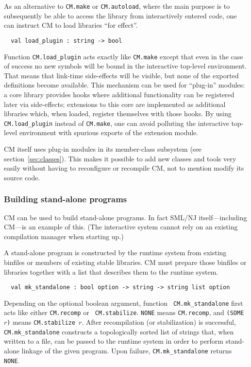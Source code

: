 \documentclass{article}
\begin{document}
As an alternative to {\tt CM.make} or {\tt CM.autoload}, where the
main purpose is to subsequently be able to access the library from
interactively entered code, one can instruct CM to load libraries
``for effect''.

\begin{verbatim}
  val load_plugin : string -> bool
\end{verbatim}

Function {\tt CM.load\_plugin} acts exactly like {\tt CM.make} except
that even in the case of success no new symbols will be bound in the
interactive top-level environment.  That means that link-time
side-effects will be visible, but none of the exported definitions
become available.  This mechanism can be used for ``plug-in'' modules:
a core library provides hooks where additional functionality can be
registered later via side-effects; extensions to this core are
implemented as additional libraries which, when loaded, register
themselves with those hooks.  By using {\tt CM.load\_plugin} instead
of {\tt CM.make}, one can avoid polluting the interactive top-level
environment with spurious exports of the extension module.

CM itself uses plug-in modules in its member-class subsystem (see
section~\ref{sec:classes}).  This makes it possible to add new classes
and tools very easily without having to reconfigure or recompile CM,
not to mention modify its source code.

\subsubsection*{Building stand-alone programs}

CM can be used to build stand-alone programs. In fact SML/NJ
itself---including CM---is an example of this.  (The interactive
system cannot rely on an existing compilation manager when starting
up.)

A stand-alone program is constructed by the runtime system from
existing binfiles or members of existing stable libraries.  CM must
prepare those binfiles or libraries together with a list that
describes them to the runtime system.

\begin{verbatim}
  val mk_standalone : bool option -> string -> string list option
\end{verbatim}

Depending on the optional boolean argument, function {\tt
CM.mk\_standalone} first acts like either {\tt CM.recomp} or {\tt
CM.stabilize}.  {\tt NONE} means {\tt CM.recomp}, and {\tt (SOME $r$)}
means {\tt CM.stabilize $r$}.  After recompilation (or stabilization)
is successful, {\tt CM.mk\_standalone} constructs a topologically
sorted list of strings that, when written to a file, can be passed to the
runtime system in order to perform stand-alone linkage of the given
program. Upon failure, {\tt CM.mk\_standalone} returns {\tt NONE}.
\end{document}
